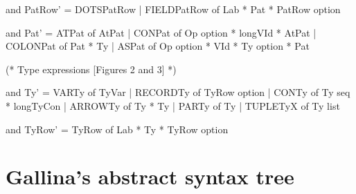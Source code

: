 \documentclass[a4paper,11pt]{article}
\begin{document}
\begin{grm}
  and PatRow' =
      DOTSPatRow
    | FIELDPatRow of Lab * Pat * PatRow option

  and Pat' =
      ATPat       of AtPat
    | CONPat      of Op option * longVId * AtPat
    | COLONPat    of Pat * Ty
    | ASPat       of Op option * VId * Ty option * Pat


  (* Type expressions [Figures 2 and 3] *)

  and Ty' =
      VARTy    of TyVar
    | RECORDTy of TyRow option
    | CONTy    of Ty seq * longTyCon
    | ARROWTy  of Ty * Ty
    | PARTy    of Ty
    | TUPLETyX  of Ty list

  and TyRow' =
      TyRow    of Lab * Ty * TyRow option
\end{grm}

\section{Gallina's abstract syntax tree}

{}

\end{document}
